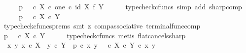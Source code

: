 \begin{isabellebody}
\ \ \isamarkupfalse%
\ \isamarkupfalse%
\ {\isachardoublequoteopen}p\isactrlsup {\isasymsharp}\ {\isacharequal}{\kern0pt}\ {\isacharparenleft}{\kern0pt}{\isacharparenleft}{\kern0pt}{\isasymt}\ {\isasymcirc}\isactrlsub c\ {\isasymbeta}\isactrlbsub X\ {\isasymtimes}\isactrlsub c\ one\isactrlesub {\isacharparenright}{\kern0pt}\ {\isasymcirc}\isactrlsub c\ {\isacharparenleft}{\kern0pt}id\ X\ {\isasymtimes}\isactrlsub f\ {\isasymbeta}\isactrlbsub Y\isactrlesub {\isacharparenright}{\kern0pt}{\isacharparenright}{\kern0pt}\isactrlsup {\isasymsharp}{\isachardoublequoteclose}\isanewline
\ \ \ \ \isamarkupfalse%
\ {\isacharparenleft}{\kern0pt}typecheck{\isacharunderscore}{\kern0pt}cfuncs{\isacharcomma}{\kern0pt}\ simp\ add{\isacharcolon}{\kern0pt}\ sharp{\isacharunderscore}{\kern0pt}comp{\isacharparenright}{\kern0pt}\isanewline
\ \ \isamarkupfalse%
\ \isamarkupfalse%
\ {\isachardoublequoteopen}p\isactrlsup {\isasymsharp}\ {\isacharequal}{\kern0pt}\ {\isacharparenleft}{\kern0pt}{\isasymt}\ {\isasymcirc}\isactrlsub c\ {\isasymbeta}\isactrlbsub X\ {\isasymtimes}\isactrlsub c\ Y\isactrlesub {\isacharparenright}{\kern0pt}\isactrlsup {\isasymsharp}{\isachardoublequoteclose}\isanewline
\ \ \ \ \isamarkupfalse%
\ {\isacharparenleft}{\kern0pt}typecheck{\isacharunderscore}{\kern0pt}cfuncs{\isacharunderscore}{\kern0pt}prems{\isacharcomma}{\kern0pt}\ smt\ {\isacharparenleft}{\kern0pt}z{}{\isacharparenright}{\kern0pt}\ comp{\isacharunderscore}{\kern0pt}associative{}\ terminal{\isacharunderscore}{\kern0pt}func{\isacharunderscore}{\kern0pt}comp{\isacharparenright}{\kern0pt}\isanewline
\ \ \isamarkupfalse%
\ \isamarkupfalse%
\ {\isachardoublequoteopen}p\ {\isacharequal}{\kern0pt}\ {\isasymt}\ {\isasymcirc}\isactrlsub c\ {\isasymbeta}\isactrlbsub X\ {\isasymtimes}\isactrlsub c\ Y\isactrlesub {\isachardoublequoteclose}\isanewline
\ \ \ \ \isamarkupfalse%
\ {\isacharparenleft}{\kern0pt}typecheck{\isacharunderscore}{\kern0pt}cfuncs{\isacharcomma}{\kern0pt}\ metis\ flat{\isacharunderscore}{\kern0pt}cancels{\isacharunderscore}{\kern0pt}sharp{\isacharparenright}{\kern0pt}\isanewline
\ \ \isamarkupfalse%
\ \isamarkupfalse%
\ {\isachardoublequoteopen}{\isasymAnd}\ x\ y{\isachardot}{\kern0pt}\ x\ {\isasymin}\isactrlsub c\ X\ {\isasymLongrightarrow}\ y\ {\isasymin}\isactrlsub c\ Y\ {\isasymLongrightarrow}\ p\ {\isasymcirc}\isactrlsub c\ {\isasymlangle}x{\isacharcomma}{\kern0pt}\ y{\isasymrangle}\ {\isacharequal}{\kern0pt}\ {\isacharparenleft}{\kern0pt}{\isasymt}\ {\isasymcirc}\isactrlsub c\ {\isasymbeta}\isactrlbsub X\ {\isasymtimes}\isactrlsub c\ Y\isactrlesub {\isacharparenright}{\kern0pt}\ {\isasymcirc}\isactrlsub c\ {\isasymlangle}x{\isacharcomma}{\kern0pt}\ y{\isasymrangle}{\isachardoublequoteclose}\isanewline

\end{isabellebody}
